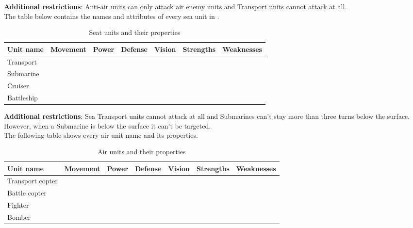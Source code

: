 \textbf{Additional restrictions}: Anti-air units can only attack air enemy
units and Transport units cannot attack at all.\\



The table below contains the names and attributes of every sea unit in \game.\\

\begin{table}[H]
    \label{tab:sea-units}
    \begin{center}
    \begin{tabular}{| l | m{1.7cm} | m{1.7cm} | m{1.7cm} | m{1.7cm} | m{2.75cm} | m{2.75cm} |}
        \hline
        \textbf{Unit name} & \textbf{Movement} & \textbf{Power} & \textbf{Defense} & \textbf{Vision} & \textbf{Strengths} & \textbf{Weaknesses} \\
        \hline
        Transport &  &  &  &  &  &  \\
        \hline
        Submarine &  &  &  &  &  &  \\
        \hline
        Cruiser &  &  &  &  &  &  \\
        \hline
        Battleship &  &  &  &  &  &  \\
        \hline
    \end{tabular}
    \end{center}
\caption{Seat units and their properties}
\end{table}

\textbf{Additional restrictions}: Sea Transport units cannot attack at all and
Submarines can't stay more than three turns below the surface. However, when a
Submarine is below the surface it can't be targeted.\\


The following table shows every air unit name and its properties.\\

\begin{table}[H]
    \label{tab:air-units}
    \begin{center}
    \begin{tabular}{| l | m{1.7cm} | m{1.7cm} | m{1.7cm} | m{1.7cm} | m{2.75cm} | m{2.75cm} |}
        \hline
        \textbf{Unit name} & \textbf{Movement} & \textbf{Power} & \textbf{Defense} & \textbf{Vision} & \textbf{Strengths} & \textbf{Weaknesses} \\
        \hline
        Transport copter &  &  &  &  &  &  \\
        \hline
        Battle copter &  &  &  &  &  &  \\
        \hline
        Fighter &  &  &  &  &  &  \\
        \hline
        Bomber &  &  &  &  &  &  \\
        \hline
    \end{tabular}
    \end{center}
\caption{Air units and their properties}
\end{table}

